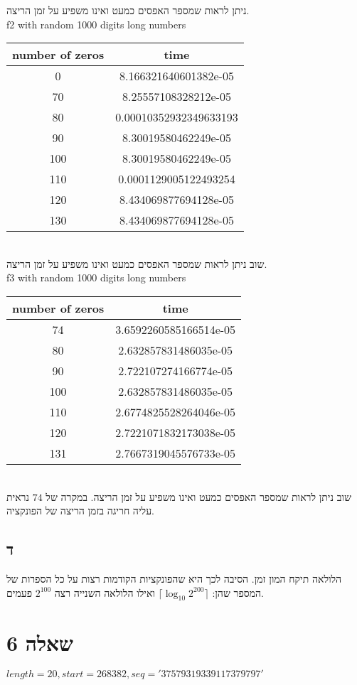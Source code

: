 \documentclass[12pt]{report}
\begin{document}
ניתן לראות שמספר האפסים כמעט ואינו משפיע על זמן הריצה.
\\
f2 with random 1000 digits long numbers
\begin{tabular}{| c | c |}
\hline
number of zeros & time \\
\hline
0 & 8.166321640601382e-05 \\
\hline
70 & 8.25557108328212e-05 \\
\hline
80 & 0.00010352932349633193 \\
\hline
90 & 8.30019580462249e-05 \\
\hline
100 & 8.30019580462249e-05 \\
\hline
110 & 0.0001129005122493254 \\
\hline
120 & 8.434069877694128e-05 \\
\hline
130 & 8.434069877694128e-05 \\	
\hline
\end{tabular}
\\ 

שוב ניתן לראות שמספר האפסים כמעט ואינו משפיע על זמן הריצה.
\\
f3 with random 1000 digits long numbers
\begin{tabular}{| c | c |}
\hline
number of zeros & time \\
\hline
74 & 3.6592260585166514e-05 \\
\hline
80 & 2.632857831486035e-05 \\
\hline
90 & 2.722107274166774e-05 \\
\hline
100 & 2.632857831486035e-05 \\
\hline
110 & 2.6774825528264046e-05 \\
\hline
120 & 2.7221071832173038e-05 \\
\hline
131 & 2.7667319045576733e-05 \\
\hline
\end{tabular}
\\

שוב ניתן לראות שמספר האפסים כמעט ואינו משפיע על זמן הריצה. במקרה של 
$74$
נראית עליה חריגה בזמן הריצה של הפונקציה.

\subsection*{ד}
הלולאה תיקח המון זמן.
הסיבה לכך היא שהפונקציות הקודמות רצות על כל הספרות של המספר שהן:
$\lceil \log_{10} 2^{200} \rceil$
ואילו הלולאה השנייה רצה 
$2^{100}$
פעמים.

\section*{שאלה 6}
$length = 20, start = 268382, seq = '37579319339117379797'$
\end{document}
